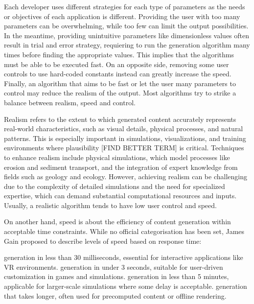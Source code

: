 Each developer uses different strategies for each type of parameters as the needs or objectives of each application is different. Providing the user with too many parameters can be overwhelming, while too few can limit the output possibilities. In the meantime, providing unintuitive parameters like dimensionless values often result in trial and error strategy, requiering to run the generation algorithm many times before finding the appropriate values. This implies that the algorithms must be able to be executed fast. On an opposite side, removing some user controls to use hard-coded constants instead can greatly increase the speed. Finally, an algorithm that aims to be fast or let the user many parameters to control may reduce the realism of the output. Most algorithms try to strike a balance between realism, speed and control.


Realism refers to the extent to which generated content accurately represents real-world characteristics, such as visual details, physical processes, and natural patterns. This is especially important in simulations, visualizations, and training environments where plausibility [FIND BETTER TERM] is critical. Techniques to enhance realism include physical simulations, which model processes like erosion and sediment transport, and the integration of expert knowledge from fields such as geology and ecology. However, achieving realism can be challenging due to the complexity of detailed simulations and the need for specialized expertise, which can demand substantial computational resources and inputs. Usually, a realistic algorithm tends to have low user control and speed.

On another hand, speed is about the efficiency of content generation within acceptable time constraints. While no official categorisation has been set, James Gain proposed to describe levels of speed based on response time:
\begin{Itemize}
     generation in less than 30 milliseconds, essential for interactive applications like VR environments. 
     generation in under 3 seconds, suitable for user-driven customization in games and simulations. 
     generation in less than 5 minutes, applicable for larger-scale simulations where some delay is acceptable. 
     generation that takes longer, often used for precomputed content or offline rendering.
\end{Itemize}

